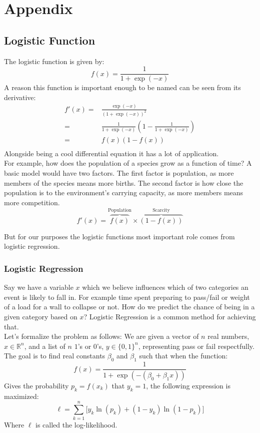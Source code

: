 
\chapter{Appendix}
\section{Logistic Function}
The logistic function is given by:
\[
f(x) = \frac{1}{1+\exp(-x)}
\]
A reason this function is important enough to be named can be seen from its derivative:
\begin{equation*}
\begin{aligned}
	f'(x) =& \frac{\exp(-x)}{(1+\exp(-x))^2}\\
	=& \frac{1}{1+\exp(-x)}\left(1-\frac{1}{1+\exp(-x)}\right)\\
	=& f(x)(1-f(x)) \\
\end{aligned}
\end{equation*}
Alongside being a cool differential equation it has a lot of application.
\\

For example, 
how does the population of a species grow as a function of time?
A basic model would have two factors.
The first factor is population,
as more members of the species means more births.
The second factor is how close the population is to the environment's carrying capacity,
as more members means more competition. 
\[
f'(x) = \overbrace{f(x)}^\text{Population}\times\overbrace{(1-f(x))}^\text{Scarcity}
\]

But for our purposes the logistic functions most important role comes from logistic regression.

\subsection{Logistic Regression}
Say we have a variable $x$ which we believe influences which of two categories an event is likely to fall in.
For example time spent preparing to pass/fail or weight of a load for a wall to collapse or not.
How do we predict the chance of being in a given category based on $x$?
Logistic Regression is a common method for achieving that.
\\

Let's formalize the problem as follows:
We are given a vector of $n$ real numbers, $x\in \mathbb{R}^n$, and a list of $n$ $1$'s or $0$'s, $y\in \{0,1\}^n$,
representing pass or fail respectfully.
The goal is to find real constants $\beta_0$ and $\beta_1$ such that when the function:
\[
	f(x) = \frac{1}{1+\exp(-(\beta_0+\beta_1 x))}
\]
Gives the probability $p_k = f(x_k)$ that $y_k=1$,
the following expression is maximized:
\[
	\ell = \sum_{k=1}^n\big[y_k\ln(p_k)+(1-y_k)\ln(1-p_k)\big]
\]
Where $\ell$ is called the log-likelihood.

